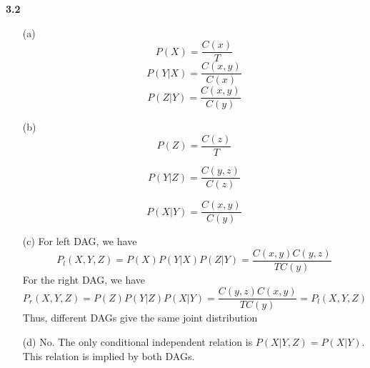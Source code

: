 \documentclass[12pt]{article} %
\theoremstyle{definition}\newtheorem{law}{Law}
\theoremstyle{plain}\newtheorem{jury}[law]{Jury}
\theoremstyle{remark}\newtheorem{juu}{Juu}
\theoremstyle{definition}\newtheorem{kuu}[law]{Kuu}
\theoremstyle{definition}\newtheorem{muu}{Muu}[section]
\theoremstyle{definition}\newtheorem{honoluu}{Honoluu}[section]
\theoremstyle{definition}\newtheorem{konoluu}[muu]{Konoluu}
\begin{document}
\textbf{3.2}
\begin{enumerate}
\item[(a)]
\begin{equation}
P(X)=\frac{C(x)}{T}
\end{equation}
\begin{equation}
P(Y|X)=\frac{C(x,y)}{C(x)}
\end{equation}
\begin{equation}
P(Z|Y)=\frac{C(x,y)}{C(y)}
\end{equation}

\item[(b)]
\begin{equation}
P(Z)=\frac{C(z)}{T}
\end{equation}

\begin{equation}
P(Y|Z)=\frac{C(y,z)}{C(z)}
\end{equation}

\begin{equation}
P(X|Y)=\frac{C(x,y)}{C(y)}
\end{equation}

\item[(c)] 
For left DAG, we have 
\begin{equation}
P_l(X, Y, Z)=P(X)P(Y|X)P(Z|Y)=\frac{C(x, y)C(y, z)}{TC(y)}
\end{equation}
For the right DAG, we have
\begin{equation}
P_r(X, Y, Z)=P(Z)P(Y|Z)P(X|Y)=\frac{C(y, z)C(x, y)}{TC(y)}=P_l(X, Y, Z)	
\end{equation}
Thus, different DAGs give the same joint distribution
\item[(d)]
No. The only conditional independent relation is $P(X|Y, Z)=P(X|Y)$. This relation is implied by both DAGs.
\end{enumerate}
\end{document}
